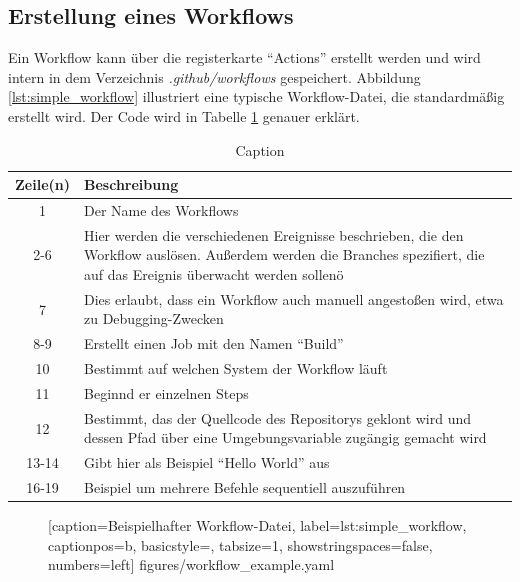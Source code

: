 \subsection{Erstellung eines Workflows}
Ein Workflow kann über die registerkarte \enquote{Actions} erstellt werden und wird intern in dem Verzeichnis \textit{.github/workflows} gespeichert. Abbildung \ref{lst:simple_workflow} illustriert eine typische Workflow-Datei, die standardmäßig erstellt wird. Der Code wird in Tabelle \ref{tab:descr_example_workflow} genauer erklärt.
\clearpage
\begin{table}[h!]
    \centering
    \begin{tabular}{c|m{10cm}}
        Zeile(n) &  Beschreibung \\\hline
         1 & Der Name des Workflows\\\hline
         2-6 & Hier werden die verschiedenen Ereignisse beschrieben, die den Workflow auslösen. Außerdem werden die Branches spezifiert, die auf das Ereignis überwacht werden sollenö\\\hline
         7 &  Dies erlaubt, dass ein Workflow auch manuell angestoßen wird, etwa zu Debugging-Zwecken\\\hline
         8-9 & Erstellt einen Job mit den Namen \enquote{Build}\\\hline
         10 & Bestimmt auf welchen System der Workflow läuft\\\hline
         11 & Beginnd er einzelnen Steps\\\hline
         12 & Bestimmt, das der Quellcode des Repositorys geklont wird und dessen Pfad über eine Umgebungsvariable zugängig gemacht wird\\\hline
         13-14 & Gibt hier als Beispiel \enquote{Hello World} aus\\\hline
         16-19 &Beispiel um mehrere Befehle sequentiell auszuführen\\\hline
         
    \end{tabular}
    \caption{Caption}
    \label{tab:descr_example_workflow}
\end{table}
		\begin{figure}[h!]
			
			[caption={Beispielhafter Workflow-Datei},
			label={lst:simple_workflow},
			captionpos=b, basicstyle=\footnotesize, tabsize=1, showstringspaces=false,  numbers=left]
			{figures/workflow_example.yaml}
		\end{figure}
	\clearpage
